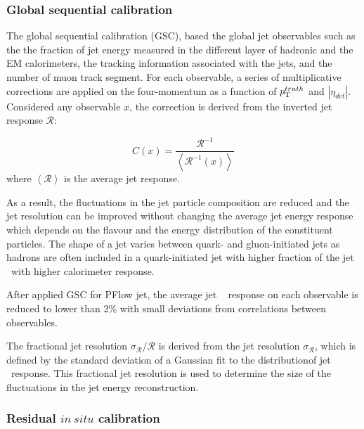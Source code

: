 {\subsubsection{Global sequential calibration}

The global sequential calibration (GSC), based the global jet observables such as the the fraction of jet energy measured in the different layer of hadronic and the EM calorimeters, the tracking information associated with the jets, and the number of muon track segment. For each observable, a series of multiplicative corrections are applied on the four-momentum as a function of $p_{\mathrm{T}}^{truth}$ and $|\eta_{det}|$.  Considered any observable $x$, the correction is derived from the inverted jet response $\mathcal{R}$:

\begin{equation}
C(x)=\frac{\mathcal{R}^{-1}}{\left\langle\mathcal{R}^{-1}(x)\right\rangle}
\end{equation}
where $\left\langle\mathcal{R}\right\rangle$ is the average jet response. 

As a result, the fluctuations in the jet particle composition are reduced and the jet resolution can be improved without changing the average jet energy response which depends on the flavour and the energy distribution of the constituent particles. The shape of a jet varies between quark- and gluon-initiated jets as hadrons are often included in a quark-initiated jet with higher fraction of the jet \pt~with higher calorimeter response.

After applied GSC for PFlow jet, the average jet \pt~ response on each observable is reduced to lower than 2\% with small deviations from correlations between observables.


The fractional jet resolution $\sigma_{\mathcal{R}} / \mathcal{R}$ is derived from the jet resolution $\sigma_{\mathcal{R}}$, which is defined by the standard deviation of a Gaussian fit to the distributionof  jet \pt~response. This fractional jet resolution is used to determine the size of the fluctuations in the jet energy reconstruction.



\subsubsection{Residual $in~situ$ calibration}

}
